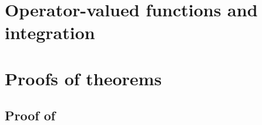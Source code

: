 
\chapter{Operator-valued functions and integration}
\label{ch:operator-valued_functions_and_integration}

\chapter{Proofs of theorems}
\label{ch:proof_of_theorems}
\section{Proof of }
